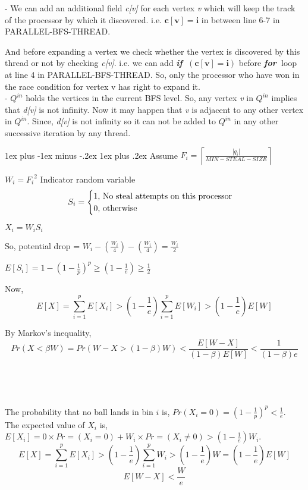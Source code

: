 \documentclass[11pt]{article}
\makeatletter
\renewcommand{\subsection}{\@startsection{subsection}{2}{0mm}%
                                     {1ex plus -1ex minus -.2ex}%
                                     {1ex plus .2ex}%
                                     {\normalfont\large\bfseries}}%
\newcommand{\ceil}[1]{\ensuremath{\left\lceil#1\right\rceil}}
\newcommand{\xif}{{\bf{\em{if~}}}}
\newcommand{\xfor}{{\bf{\em{for~}}}}
\makeatother
\begin{document}
- We can add an additional field {\it c[v]} for each vertex {\it v} which will keep the track of the processor by which it discovered. i.e. $\mathbf{c[v] = i}$ in between line 6-7 in PARALLEL-BFS-THREAD.

And before expanding a vertex we check whether the vertex is discovered by this thread or not by checking {\it c[v]}. i.e. we can add \xif $\mathbf{(c[v] = i)}$ before \xfor loop at line 4 in PARALLEL-BFS-THREAD. So, only the processor who have won in the race condition for vertex v has right to expand it.\\

- $Q^{in}$ holds the vertices in the current BFS level. So, any vertex {\it v} in $Q^{in}$ implies that {\it d[v]} is not infinity. Now it may happen that {\it v} is adjacent to any other vertex in $Q^{in}$. Since, {\it d[v]} is not infinity so it can not be added to $Q^{in}$ in any other successive iteration by any thread.      

\subsection{}
Assume $F_i = \ceil {\frac {|q_i|}{MIN-STEAL-SIZE}}$

$W_i = {F_i}^2$
Indicator random variable \[
S_i = \begin{cases}
1 , $ No steal attempts on this processor$\\
0 , $  otherwise$
\end{cases}
\]

$X_i = W_i S_i$

So, potential drop = $W_i - (\frac{W_i}{4}) - (\frac{W_i}{4}) = \frac{W_i}{2}$

$E[S_i] = 1 - {(1-\frac{1}{p})}^p \geq (1-\frac{1}{e}) \geq \frac{1}{2}$

Now, \[
E \left[ X \right] = \sum \limits_{i=1}^p E \left[ X_i \right] > \left( 1 - \frac{1}{e} \right) \sum \limits_{i=1}^p E[W_i] >\left( 1 - \frac{1}{e} \right) E \left [W \right ]
\]

By Markov's inequality,\\
\[Pr \left( X < \beta W \right) = Pr \left( W - X > (1 - \beta)W \right) < \frac {E \left[ W - X \right]}{\left(1 - \beta \right)  E[W]} < \frac {1}{\left(1 - \beta \right) e }
\] \\\\\\\\


The probability that no ball lands in bin $i$ is, $Pr ( X_i = 0 ) = \left( 1 - \frac{1}{p} \right)^p < \frac {1}{e}$.\\
The expected value of $X_i$ is, $E \left[ X_i \right] = 0 \times Pr =\left( X_i = 0 \right) + W_i \times 
Pr =\left( X_i \ne 0 \right) > \left( 1 - \frac{1}{e} \right) W_i$.\\
\[
E \left[ X \right] = \sum \limits_{i=1}^p E \left[ X_i \right] > \left( 1 - \frac{1}{e} \right) \sum \limits_{i=1}^p W_i >\left( 1 - \frac{1}{e} \right) W = \left( 1 - \frac{1}{e} \right) E\left[ W \right] 
\]
\[
E \left[ W - X \right] < \frac {W}{e}
\]
\end{document}
